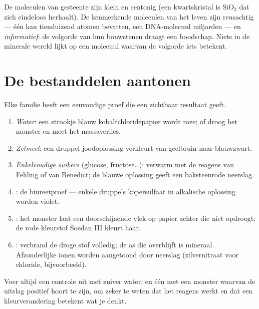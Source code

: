 \begin{remark}\label{rem:g10:chemistry-of-life:macromolecules}
De moleculen van gesteente zijn klein en eentonig (een kwartskristal is
$\mathrm{SiO_2}$ dat zich eindeloos herhaalt). De kenmerkende moleculen
van het leven zijn reusachtig --- één  kan tienduizend atomen
bevatten, een DNA-molecuul miljarden --- en \emph{informatief}: de
volgorde van hun bouwstenen draagt een boodschap. Niets in de minerale
wereld lijkt op een molecuul waarvan de volgorde iets betekent.
\end{remark}

\section{De bestanddelen aantonen}

\begin{method}\label{met:g10:chemistry-of-life:tests}
Elke familie heeft een eenvoudige proef die een zichtbaar resultaat
geeft.
\begin{enumerate}
  \item \emph{Water}: een strookje blauw kobaltchloridepapier wordt
        roze; of droog het monster en meet het massaverlies.
  \item \emph{Zetmeel}: een druppel joodoplossing verkleurt van
        geelbruin naar blauwzwart.
  \item \emph{Enkelvoudige suikers} (glucose, fructose\dots): verwarm
        met de reagens van Fehling of van Benedict; de blauwe oplossing
        geeft een baksteenrode neerslag.
  \item \emph{}: de biureetproef --- enkele druppels
        kopersulfaat in alkalische oplossing worden violet.
  \item \emph{}: het monster laat een doorschijnende vlek op
        papier achter die niet opdroogt; de rode kleurstof Soedan III
        kleurt haar.
  \item \emph{}: verbrand de droge stof volledig; de as
        die overblijft is mineraal. Afzonderlijke ionen worden
        aangetoond door neerslag (zilvernitraat voor chloride,
        bijvoorbeeld).
\end{enumerate}
Voer altijd een controle uit met zuiver water, en één met een monster
waarvan de uitslag positief hoort te zijn, om zeker te weten dat het
reagens werkt en dat een kleurverandering betekent wat je denkt.
\end{method}

